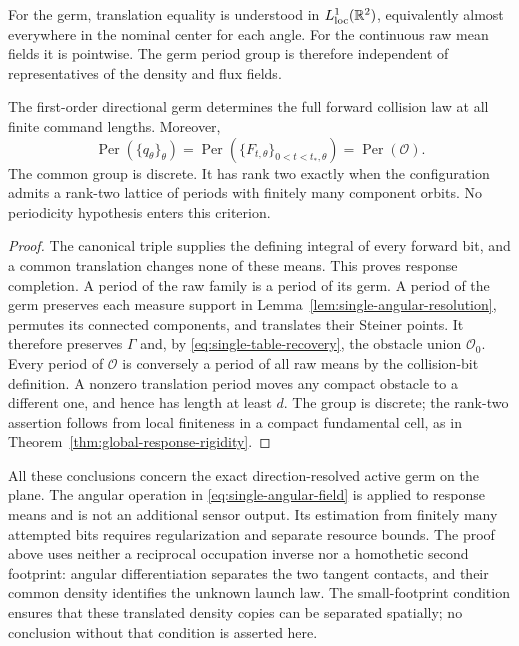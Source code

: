 For the germ, translation equality is understood in
$L^1_{\mathrm{loc}}(\mathbb R^2)$, equivalently almost everywhere in the
nominal center for each angle.  For the continuous raw mean fields
it is pointwise.  The germ period group is therefore independent
of representatives of the density and flux fields.

\begin{corollary}
\label{cor:single-germ-periods}
The first-order directional germ determines the full forward
collision law at all finite command lengths.  Moreover,
\begin{equation}\label{eq:single-germ-periods}
 \operatorname{Per}(\{q_\theta\}_\theta)
 =\operatorname{Per}(\{F_{t,\theta}\}_{0<t<t_*,\theta})
 =\operatorname{Per}(\mathcal O).
\end{equation}
The common group is discrete.  It has rank two exactly when the
configuration admits a rank-two lattice of periods with finitely
many component orbits.  No periodicity hypothesis enters this
criterion.
\end{corollary}
\begin{proof}
The canonical triple supplies the defining integral of every
forward bit, and a common translation changes none of these means.
This proves response completion.  A period of the raw family is a
period of its germ.  A period of the germ preserves each measure
support in Lemma~\ref{lem:single-angular-resolution}, permutes its
connected components, and translates their Steiner points.
It therefore preserves $\Gamma$ and, by
\eqref{eq:single-table-recovery}, the obstacle union $\mathcal O_0$.
Every period of $\mathcal O$ is conversely a period of all raw
means by the collision-bit definition.
A nonzero translation period moves any compact obstacle to a
different one, and hence has length at least $d$.  The group is
discrete; the rank-two assertion follows from local finiteness in
a compact fundamental cell, as in
Theorem~\ref{thm:global-response-rigidity}.
\end{proof}

All these conclusions concern the exact direction-resolved active
germ on the plane.  The angular operation in
\eqref{eq:single-angular-field} is applied to response means and
is not an additional sensor output.  Its estimation from finitely
many attempted bits requires regularization and separate resource
bounds.  The proof above uses neither a reciprocal occupation inverse
nor a homothetic second footprint: angular differentiation separates
the two tangent contacts, and their common density identifies the
unknown launch law.  The small-footprint condition ensures that these
translated density copies can be separated spatially; no conclusion
without that condition is asserted here.
